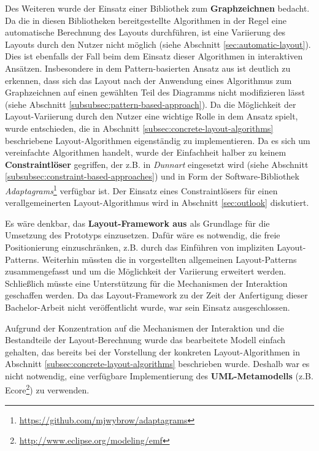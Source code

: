 Des Weiteren wurde der Einsatz einer Bibliothek zum \textbf{Graphzeichnen} bedacht. Da die in diesen Bibliotheken bereitgestellte Algorithmen in der Regel eine automatische Berechnung des Layouts durchführen, ist eine Variierung des Layouts durch den Nutzer nicht möglich (siehe Abschnitt \ref{sec:automatic-layout}). Dies ist ebenfalls der Fall beim dem Einsatz dieser Algorithmen in interaktiven Ansätzen. Insbesondere in dem Pattern-basierten Ansatz aus \cite{Maier12A-Pattern-based} ist deutlich zu erkennen, dass sich das Layout nach der Anwendung eines Algorithmus zum Graphzeichnen auf einen gewählten Teil des Diagramms nicht modifizieren lässt (siehe Abschnitt \ref{subsubsec:pattern-based-approach}). Da die Möglichkeit der Layout-Variierung durch den Nutzer eine wichtige Rolle in dem Ansatz spielt, wurde entschieden, die in Abschnitt \ref{subsec:concrete-layout-algorithms} beschriebene Layout-Algorithmen eigenständig zu implementieren. Da es sich um vereinfachte Algorithmen handelt, wurde der Einfachheit halber zu keinem \textbf{Constraintlöser} gegriffen, der z.B. in \textit{Dunnart} eingesetzt wird (siehe Abschnitt \ref{subsubsec:constraint-based-approaches}) und in Form der Software-Bibliothek \textit{Adaptagrams}\footnote{\url{https://github.com/mjwybrow/adaptagrams}} verfügbar ist. Der Einsatz eines Constraintlösers für einen verallgemeinerten Layout-Algorithmus wird in Abschnitt \ref{sec:outlook} diskutiert.

Es wäre denkbar, das \textbf{Layout-Framework aus \cite{Maier12A-Pattern-based}} als Grundlage für die Umsetzung des Prototyps einzusetzen. Dafür wäre es notwendig, die freie Positionierung einzuschränken, z.B. durch das Einführen von impliziten Layout-Patterns. Weiterhin müssten die in \cite{Maier12A-Pattern-based} vorgestellten allgemeinen Layout-Patterns zusammengefasst und um die Möglichkeit der Variierung erweitert werden. Schließlich müsste eine Unterstützung für die Mechanismen der Interaktion geschaffen werden. Da das Layout-Framework zu der Zeit der Anfertigung dieser Bachelor-Arbeit nicht veröffentlicht wurde, war sein Einsatz ausgeschlossen.

Aufgrund der Konzentration auf die Mechanismen der Interaktion und die Bestandteile der Layout-Berechnung wurde das bearbeitete Modell einfach gehalten, das bereits bei der Vorstellung der konkreten Layout-Algorithmen in Abschnitt \ref{subsec:concrete-layout-algorithms} beschrieben wurde. Deshalb war es nicht notwendig, eine verfügbare Implementierung des \textbf{UML-Metamodells} (z.B. Ecore\footnote{\url{http://www.eclipse.org/modeling/emf}}) zu verwenden.

